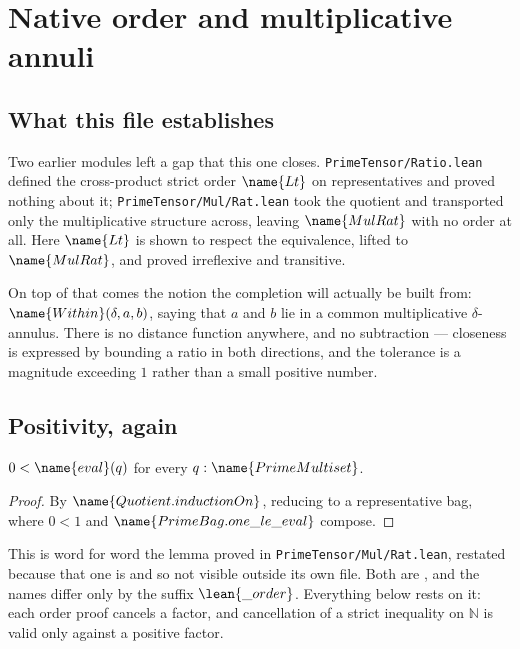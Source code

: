 
\section{Native order and multiplicative annuli}
\label{Order:sec}


\subsection*{What this file establishes}

Two earlier modules left a gap that this one closes.
\texttt{PrimeTensor/Ratio.lean} defined the cross-product strict order
$\name{Lt}$ on representatives and proved nothing about it;
\texttt{PrimeTensor/Mul/Rat.lean} took the quotient and transported only the
multiplicative structure across, leaving $\name{MulRat}$ with no order at all.
Here $\name{Lt}$ is shown to respect the equivalence, lifted to
$\name{MulRat}$, and proved irreflexive and transitive.

On top of that comes the notion the completion will actually be built from:
$\name{Within}(\delta, a, b)$, saying that $a$ and $b$ lie in a common
multiplicative $\delta$-annulus.  There is no distance function anywhere, and
no subtraction --- closeness is expressed by bounding a ratio in both
directions, and the tolerance is a magnitude exceeding $1$ rather than a small
positive number.

\subsection{Positivity, again}

\begin{lemma}\label{Order:lem:pos}
$0 < \name{eval}(q)$ for every $q : \name{PrimeMultiset}$.
\end{lemma}

\begin{proof}
By $\name{Quotient.inductionOn}$, reducing to a representative bag, where
$0 < 1$ and $\name{PrimeBag.one\_le\_eval}$ compose.
\end{proof}

This is word for word the lemma proved in
\texttt{PrimeTensor/Mul/Rat.lean}, restated because that one is 
and so not visible outside its own file.  Both are , and the
names differ only by the suffix $\lean{\_order}$.  Everything below rests on
it: each order proof cancels a factor, and cancellation of a strict inequality
on $\mathbb{N}$ is valid only against a positive factor.

